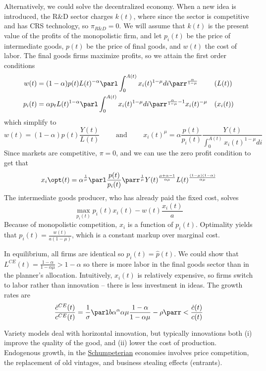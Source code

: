 \documentclass[10pt]{article}
\begin{document}
\begin{model}
	Alternatively, we could solve the decentralized economy. When a new idea is introduced, the R\&D sector charges $k(t)$, where since the sector is competitive and has CRS technology, so $\pi_{R\&D} = 0$. We will assume that $k(t)$ is the present value of the profits of the monopolistic firm, and let $p_i(t)$ be the price of intermediate goods, $p(t)$ be the price of final goods, and $w(t)$ the cost of labor. The final goods firms maximize profits, so we attain the first order conditions 
	\begin{align*}
		w(t) &= (1-\alpha)p(t)L(t)^{-\alpha} \parl \int_0^{A(t)}x_i(t)^{1-\mu}di\parr^{\frac{\alpha}{1-\mu}} &&(L(t)) \\
		p_i(t) &= \alpha p_tL(t)^{1-\alpha} \parl \int_0^{A(t)} x_i(t)^{1-\mu} di \parr^{\frac{\alpha}{1-\mu} - 1}x_i(t)^{-\mu} &&(x_i(t))
	\end{align*}
	which simplify to
	\[w(t) = (1-\alpha)p(t)\frac{Y(t)}{L(t)} \qquad \text{ and } \qquad x_i(t)^\mu = \alpha \frac{p(t)}{p_i(t)}\frac{Y(t)}{\int_0^{A(t)} x_i(t)^{1-\mu}di}\]
	Since markets are competitive, $\pi =0$, and we can use the zero profit condition to get that 
	\[
	x_i\opt(t) = \alpha^{\frac{1}{\mu}}\parl \frac{p(t)}{p_i(t)}\parr^{\frac{1}{\mu}} Y(t)^{\frac{\mu+\alpha-1}{\alpha\mu}}L(t)^{\frac{(1-\mu)(1-\alpha)}{\alpha\mu}}
	\]
	The intermediate goods producer, who has already paid the fixed cost, solves\[\max_{p_i(t)} p_i(t)x_i(t) - w(t) \frac{x_i(t)}{a}\]Because of monopolistic competition, $x_i$ is a function of $p_i(t)$. Optimality yields that $p_i(t) = \frac{w(t)}{a(1-\mu)}$, which is a constant markup over marginal cost.
	
	In equilibrium, all firms are identical so $p_i(t) = \hat{p}(t)$. We could show that $L^{CE}(t) = \frac{1-\alpha}{1-\alpha\mu} > 1-\alpha$ so there is more labor in the final goods sector than in the planner's allocation. Intuitively, $x_i(t)$ is relatively expensive, so firms switch to labor rather than innovation -- there is less investment in ideas. The growth rates are
	\[
	\frac{\dot{c}^{CE}(t)}{c^{CE}(t)} = \frac{1}{\sigma} \parl b\alpha^\alpha \alpha\mu \frac{1-\alpha}{1-\alpha\mu} - \rho\parr < \frac{\dot{c}(t)}{c(t)}
	\]
\end{model}


\begin{remark}
	Variety models deal with horizontal innovation, but typically innovations both (i) improve the quality of the good, and (ii) lower the cost of production. Endogenous growth, in the \href{https://en.wikipedia.org/wiki/Joseph_Schumpeter}{Schumpeterian} economies involves price competition, the replacement of old vintages, and business stealing effects (entrants).
\end{remark}
\end{document}
